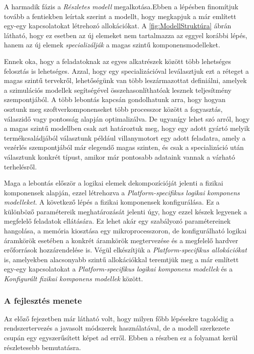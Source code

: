         A harmadik fázis a \emph{Részletes modell} megalkotása.Ebben a lépésben finomítjuk tovább a fentiekben leírtak szerint a modellt, hogy megkapjuk a már említett egy-egy kapcsolatokat létrehozó allokációkat.
        A \ref{fig:ModellStruktúra} ábrán látható, hogy ez esetben az új elemeket nem tartalmazza az eggyel korábbi lépés, hanem az új elemek \emph{specializálják} a magas szintű komponensmodelleket.
        
        Ennek oka, hogy a feladatoknak az egyes alkatrészek között több lehetséges felosztás is lehetséges. Azzal, hogy egy specializációval leválasztjuk ezt a réteget a magas szintű tervekről, lehetőségünk van több leszármazottat definiálni, amelyek a szimulációs modellek segítségével összehasonlíthatóak lesznek teljesítmény szempontjából.
        A több lebontás kapcsán gondolhatunk arra, hogy hogyan osztunk meg szoftverkomponenseket több processzor között a fogyasztás, válaszidő vagy pontosság alapján optimalizálva. De ugyanígy lehet szó arról, hogy a magas szintű modellben csak azt határoztuk meg, hogy egy adott gyártó melyik termékcsaládjából választunk például villanymotort egy adott feladatra, amely a vezérlés szempontjából már elegendő magas szinten, és csak a specializáció után választunk konkrét típust, amikor már pontosabb adataink vannak a várható terhelésről.

        Maga a lebontás először a logikai elemek dekompozícióját jelenti a fizikai komponensek alapján, ezzel létrehozva a \emph{Platform-specifikus logikai komponens modelleket}.
        A következő lépés a fizikai komponensek konfigurálása. Ez a különböző paramétereik meghatározását jelenti úgy, hogy ezzel készek legyenek a megfelelő feladatok ellátására.
        Ez lehet akár egy szabályozó paramétereinek hangolása, a memória kiosztása egy mikroprocesszoron, de konfigurálható logikai áramkörök esetében a konkrét áramkörök megtervezése és a megfelelő hardver erőforrások hozzárendelése is.
        Végül elkészítjük a \emph{Platform-specifikus allokációkat} is, amelyekben alacsonyabb szintű allokációkkal teremtjük meg a már említett egy-egy kapcsolatokat a \emph{Platform-specifikus logikai komponens modellek} és a \emph{Konfigurált fizikai komponens modellek} között.

        \subsubsection{A fejlesztés menete} \label{sec:flow}
        Az előző fejezetben már látható volt, hogy milyen főbb lépésekre tagolódig a rendszertervezés a javasolt módszerek használatával, de a modell szerkezete csupán egy egyszerűsített képet ad erről.
        Ebben a részben ez a folyamat kerül részletesebb bemutatásra.
        
